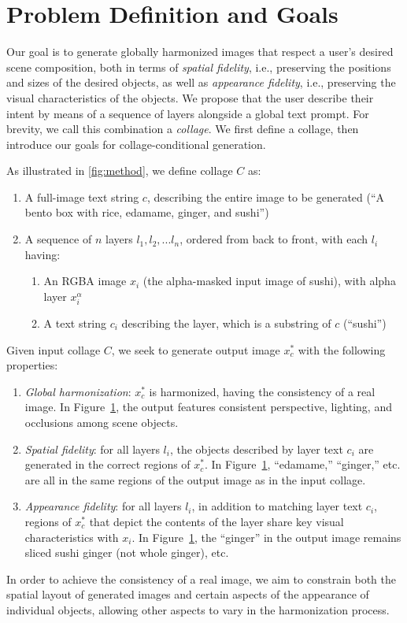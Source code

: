 \section{Problem Definition and Goals}
\label{sec:problem}
\vspace{-0.5em}

Our goal is to generate globally harmonized images that respect a user's desired scene composition, both in terms of \textit{spatial fidelity}, i.e., preserving the positions and sizes of the desired objects, as well as \textit{appearance fidelity}, i.e., preserving the visual characteristics of the objects. 
We propose that the user describe their intent by means of a sequence of layers alongside a global text prompt. For brevity, we call this combination a \emph{collage}. 
We first define a collage, then introduce our goals for collage-conditional generation. 

As illustrated in \cref{fig:method}, we define collage $C$ as:
\begin{enumerate}%
    \item A full-image text string $c$, describing the entire image to be generated (``A bento box with rice, edamame, ginger, and sushi'')
    \item A sequence of $n$ layers $l_1, l_2, ... l_n$, ordered from back to front, with each $l_i$ having:
    \begin{enumerate}[labelsep=0.5em,itemsep=-0.25em]
        \item An RGBA image $x_i$ (the alpha-masked input image of sushi), with alpha layer $x^\alpha_i$ 
        \item A text string $c_i$ describing the layer, which is a substring of $c$ (``sushi'')
    \end{enumerate} 
\end{enumerate}

Given input collage $C$, 
we seek to generate output image $x^*_c$ with the following properties:
\begin{enumerate}%
    \item \textit{Global harmonization}: $x^*_c$ is harmonized, having the consistency of a real image. In Figure~\hyperlink{fig:teaser}{1}, the output features consistent perspective, lighting, and occlusions among scene objects. 
    \item \textit{Spatial fidelity}: for all layers $l_i$, the objects described by layer text $c_i$ are generated in the correct regions of $x^*_c$. In Figure~\hyperlink{fig:teaser}{1}, ``edamame,'' ``ginger,'' etc. are all in the same regions of the output image as in the input collage.
    \item \textit{Appearance fidelity}: for all layers $l_i$, in addition to matching layer text $c_i$, regions of $x^*_c$ that depict the contents of the layer share key visual characteristics with $x_i$. In Figure~\hyperlink{fig:teaser}{1}, the ``ginger'' in the output image remains sliced sushi ginger (not whole ginger), etc.
\end{enumerate}

In order to achieve the consistency of a real image, we aim to constrain both the spatial layout of generated images and certain aspects of the appearance of individual objects, allowing other aspects to vary in the harmonization process. 
